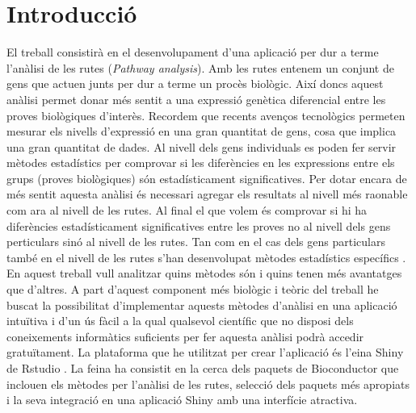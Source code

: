 %
%
% 
% 
% 

\newenvironment{mykeithtabbing}[1]{%
\begin{tabular}{lp{0.9\hsize}}
}{%
\end{tabular}
}

\newcommand{\mybadgood}[2]{%
\begin{mykeithtabbing}
{}\emph{Bad:}  & \sout{#1}  \\
\emph{Good:}   & #2  \\
\end{mykeithtabbing}
}



\chapter{Introducció}

El treball consistirà en el desenvolupament d'una aplicació per dur a terme l'anàlisi de les rutes (\textit{Pathway analysis}). Amb les rutes entenem un conjunt de gens que actuen junts per dur a terme un procès biològic. Així doncs aquest anàlisi permet donar més sentit a una expressió genètica diferencial entre les proves biològiques d'interès. Recordem que recents avenços tecnològics permeten mesurar els nivells d'expressió en una gran quantitat de gens, cosa que implica una gran quantitat de dades. Al nivell dels gens individuals es poden fer servir mètodes estadístics per comprovar si les diferències en les expressions entre els grups (proves biològiques) són estadísticament significatives. Per dotar encara de més sentit aquesta anàlisi és necessari agregar els resultats al nivell més raonable com ara al nivell de les rutes. Al final el que volem és comprovar si hi ha diferències estadísticament significatives entre les proves no al nivell dels gens perticulars sinó al nivell de les rutes. Tan com en el cas dels gens particulars també en el nivell de les rutes s'han desenvolupat mètodes estadístics específics \cite{khatri2012ten}. En aquest treball vull analitzar quins mètodes són i quins tenen més avantatges que d'altres. A part d'aquest component més biològic i teòric del treball he buscat la possibilitat d'implementar aquests mètodes d'anàlisi en una aplicació intuïtiva i d'un ús fàcil a la qual qualsevol científic que no disposi dels coneixements informàtics suficients per fer aquesta anàlisi podrà accedir gratuïtament. La plataforma que he utilitzat per crear l'aplicació és l'eina Shiny de Rstudio \cite{Shiny}.  La feina ha consistit en la cerca dels paquets de Bioconductor que inclouen els mètodes per l'anàlisi de les rutes, selecció dels paquets més apropiats i la seva integració en una aplicació Shiny amb una interfície atractiva. 

